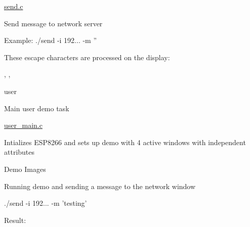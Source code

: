 \begin{DoxyItemize}
\item \hyperlink{send_8c}{send.\-c}
\begin{DoxyItemize}
\item Send message to network server
\item Example\-: ./send -\/i 192... -\/m ''
\begin{DoxyItemize}
\item These escape characters are processed on the display\-: \par
, , 
\end{DoxyItemize}
\end{DoxyItemize}
\end{DoxyItemize}

user
\begin{DoxyItemize}
\item Main user demo task
\item \hyperlink{user__main_8c}{user\-\_\-main.\-c}
\begin{DoxyItemize}
\item Intializes E\-S\-P8266 and sets up demo with 4 active windows with independent attributes
\end{DoxyItemize}
\end{DoxyItemize}

\begin{DoxyParagraph}{Demo Images}

\begin{DoxyItemize}
\item Running demo and sending a message to the network window
\item ./send -\/i 192... -\/m 'testing'
\begin{DoxyItemize}
\item Result\-:  
\end{DoxyItemize}
\end{DoxyItemize}
\end{DoxyParagraph}
